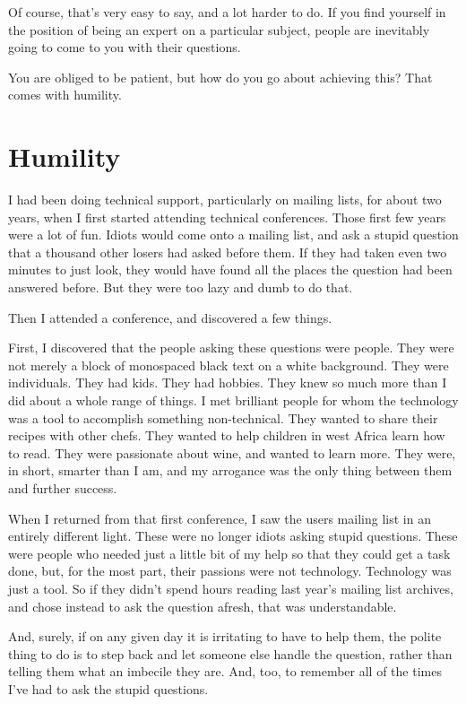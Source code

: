 Of course, that’s very easy to say, and a lot harder to do. If you find yourself in the position of being an expert on a particular subject, people are inevitably going to come to you with their questions.

You are obliged to be patient, but how do you go about achieving this? That comes with humility.

\section*{Humility}
I had been doing technical support, particularly on mailing lists, for about two years, when I first started attending technical conferences. Those first few years were a lot of fun. Idiots would come onto a mailing list, and ask a stupid question that a thousand other losers had asked before them. If they had taken even two minutes to just look, they would have found all the places the question had been answered before. But they were too lazy and dumb to do that.

Then I attended a conference, and discovered a few things.

First, I discovered that the people asking these questions were people. They were not merely a block of monospaced black text on a white background. They were individuals. They had kids. They had hobbies. They knew so much more than I did about a whole range of things. I met brilliant people for whom the technology was a tool to accomplish something non-technical. They wanted to share their recipes with other chefs. They wanted to help children in west Africa learn how to read. They were passionate about wine, and wanted to learn more. They were, in short, smarter than I am, and my arrogance was the only thing between them and further success.

When I returned from that first conference, I saw the users mailing list in an entirely different light. These were no longer idiots asking stupid questions. These were people who needed just a little bit of my help so that they could get a task done, but, for the most part, their passions were not technology. Technology was just a tool. So if they didn’t spend hours reading last year’s mailing list archives, and chose instead to ask the question afresh, that was understandable.

And, surely, if on any given day it is irritating to have to help them, the polite thing to do is to step back and let someone else handle the question, rather than telling them what an imbecile they are. And, too, to remember all of the times I’ve had to ask the stupid questions.

